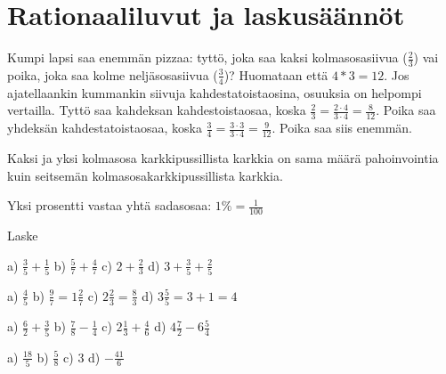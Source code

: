 \chapter{Rationaaliluvut ja laskusäännöt}


Kumpi lapsi saa enemmän pizzaa: tyttö, joka saa kaksi kolmasosasiivua ($ \frac{2}{3}$) vai poika, joka saa kolme neljäsosasiivua ($ \frac{3}{4}$)? Huomataan että $4*3=12$. Jos ajatellaankin kummankin siivuja kahdestatoistaosina, osuuksia on helpompi vertailla. Tyttö saa kahdeksan kahdestoistaosaa, koska $ \frac{2}{3} = \frac{2 \cdot 4}{3 \cdot 4} = \frac{8}{12}$. Poika saa yhdeksän kahdestatoistaosaa, koska $ \frac{3}{4} = \frac{3 \cdot 3}{3 \cdot 4} = \frac{9}{12}$. Poika saa siis enemmän.



Kaksi ja yksi kolmasosa karkkipussillista karkkia on sama määrä pahoinvointia kuin seitsemän kolmasosakarkkipussillista karkkia.


Yksi prosentti vastaa yhtä sadasosaa: $1 \% = \frac{1}{100}$

Laske %

\begin{tehtava}
a) $\frac{3}{5} + \frac{1}{5}$
b) $\frac{5}{7} + \frac{4}{7}$
c) $2 + \frac{2}{3}$
d) $3 + \frac{3}{5} + \frac{2}{5}$    
    \begin{vastaus}
        a) $\frac{4}{5}$
				b) $\frac{9}{7} = 1 \frac{2}{7}$
				c) $2 \frac{2}{3} = \frac{8}{3}$
				d) $3 \frac{5}{5} = 3+1 = 4$
    \end{vastaus}
\end{tehtava}

\begin{tehtava}
    a) $\frac{6}{2} + \frac{3}{5}$
    b) $\frac{7}{8} - \frac{1}{4}$
    c) $2 \frac{1}{3} + \frac{4}{6}$
    d) $4 \frac{7}{2} - 6 \frac{5}{4}$
    
    \begin{vastaus}
        a) $\frac{18}{5}$
        b) $\frac{5}{8}$
        c) $3$
        d) $-\frac{41}{6}$
    \end{vastaus}
\end{tehtava}

